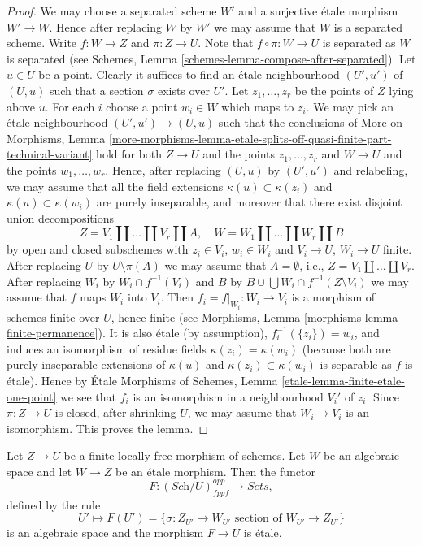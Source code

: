 \begin{proof}
We may choose a separated scheme $W'$ and a surjective \'etale morphism
$W' \to W$. Hence after replacing $W$ by $W'$ we may assume that $W$
is a separated scheme. Write $f : W \to Z$ and $\pi : Z \to U$.
Note that $f \circ \pi : W \to U$ is separated as
$W$ is separated (see
Schemes, Lemma \ref{schemes-lemma-compose-after-separated}).
Let $u \in U$ be a point. Clearly it suffices
to find an \'etale neighbourhood $(U', u')$ of $(U, u)$ such that
a section $\sigma$ exists over $U'$. Let $z_1, \ldots, z_r$
be the points of $Z$ lying above $u$. For each $i$ choose a point
$w_i \in W$ which maps to $z_i$. We may pick an \'etale neighbourhood
$(U', u') \to (U, u)$ such that the conclusions of
More on Morphisms, Lemma
\ref{more-morphisms-lemma-etale-splits-off-quasi-finite-part-technical-variant}
hold for both $Z \to U$ and the points $z_1, \ldots, z_r$
and $W \to U$ and the points $w_1, \ldots, w_r$. Hence, after
replacing $(U, u)$ by $(U', u')$ and relabeling, we may assume that
all the field extensions $\kappa(u) \subset \kappa(z_i)$ and
$\kappa(u) \subset \kappa(w_i)$ are purely inseparable, and moreover
that there exist disjoint union decompositions
$$
Z = V_1 \amalg \ldots \amalg V_r \amalg A, \quad
W = W_1 \amalg \ldots \amalg W_r \amalg B
$$
by open and closed subschemes
with $z_i \in V_i$, $w_i \in W_i$ and $V_i \to U$, $W_i \to U$ finite.
After replacing $U$ by $U \setminus \pi(A)$ we may assume that
$A = \emptyset$, i.e., $Z = V_1 \amalg \ldots \amalg V_r$.
After replacing $W_i$ by $W_i \cap f^{-1}(V_i)$ and
$B$ by $B \cup \bigcup W_i \cap f^{-1}(Z \setminus V_i)$
we may assume that $f$ maps $W_i$ into $V_i$.
Then $f_i = f|_{W_i} : W_i \to V_i$ is a morphism of schemes finite over $U$,
hence finite (see
Morphisms, Lemma \ref{morphisms-lemma-finite-permanence}).
It is also \'etale (by assumption),
$f_i^{-1}(\{z_i\}) = w_i$, and induces an isomorphism of residue
fields $\kappa(z_i) = \kappa(w_i)$ (because both are purely inseparable
extensions of $\kappa(u)$ and $\kappa(z_i) \subset \kappa(w_i)$
is separable as $f$ is \'etale). Hence by
\'Etale Morphisms of Schemes, Lemma \ref{etale-lemma-finite-etale-one-point}
we see that $f_i$ is an isomorphism in a neighbourhood $V_i'$ of
$z_i$. Since $\pi : Z \to U$ is closed, after shrinking $U$, we may assume
that $W_i \to V_i$ is an isomorphism. This proves the lemma.
\end{proof}

\begin{lemma}
\label{lemma-space-of-sections}
Let $Z \to U$ be a finite locally free morphism of schemes.
Let $W$ be an algebraic space and let $W \to Z$ be an \'etale morphism.
Then the functor
$$
F : (\textit{Sch}/U)_{fppf}^{opp} \longrightarrow \textit{Sets},
$$
defined by the rule
$$
U' \longmapsto
F(U') =
\{\sigma : Z_{U'} \to W_{U'}\text{ section of }W_{U'} \to Z_{U'}\}
$$
is an algebraic space and the morphism $F \to U$ is \'etale.
\end{lemma}

